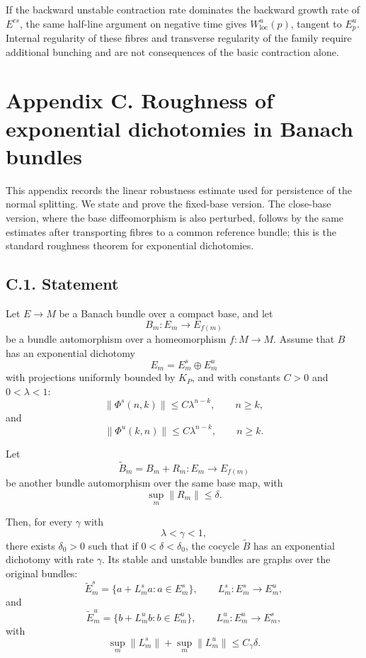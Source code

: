 \documentclass[12pt,a4paper]{article}
\theoremstyle{plain}
\numberwithin{equation}{section}
\numberwithin{theorem}{section}
\begin{document}
If the backward unstable contraction rate dominates the backward growth rate of $E^{cs}$, the same half-line argument on negative time gives $W^u_{\mathrm{loc}}(p)$, tangent to $E^u_p$. Internal regularity of these fibres and transverse regularity of the family require additional bunching and are not consequences of the basic contraction alone.

\clearpage

\section{Appendix C. Roughness of exponential dichotomies in Banach bundles}

This appendix records the linear robustness estimate used for persistence of the normal splitting. We state and prove the fixed-base version. The close-base version, where the base diffeomorphism is also perturbed, follows by the same estimates after transporting fibres to a common reference bundle; this is the standard roughness theorem for exponential dichotomies.

\subsection{C.1. Statement}

Let $E\to M$ be a Banach bundle over a compact base, and let
\[
B_m:E_m\to E_{f(m)}
\]
be a bundle automorphism over a homeomorphism $f:M\to M$. Assume that $B$ has an exponential dichotomy
\[
E_m=E_m^s\oplus E_m^u
\]
with projections uniformly bounded by $K_P$, and with constants $C>0$ and $0<\lambda<1$:
\[
\|\Phi^s(n,k)\|\le C\lambda^{n-k},
\qquad n\ge k,
\]
and
\[
\|\Phi^u(k,n)\|\le C\lambda^{n-k},
\qquad n\ge k.
\]

Let
\[
\widetilde B_m=B_m+R_m:E_m\to E_{f(m)}
\]
be another bundle automorphism over the same base map, with
\[
\sup_m\|R_m\|\le\delta.
\]

Then, for every $\gamma$ with
\[
\lambda<\gamma<1,
\]
there exists $\delta_0>0$ such that if $0<\delta<\delta_0$, the cocycle $\widetilde B$ has an exponential dichotomy with rate $\gamma$. Its stable and unstable bundles are graphs over the original bundles:
\[
\widetilde E_m^s=\{a+L_m^s a:a\in E_m^s\},
\qquad
L_m^s:E_m^s\to E_m^u,
\]
and
\[
\widetilde E_m^u=\{b+L_m^u b:b\in E_m^u\},
\qquad
L_m^u:E_m^u\to E_m^s,
\]
with
\[
\sup_m\|L_m^s\|+\sup_m\|L_m^u\|
\le C_\gamma\delta.
\]
\end{document}
